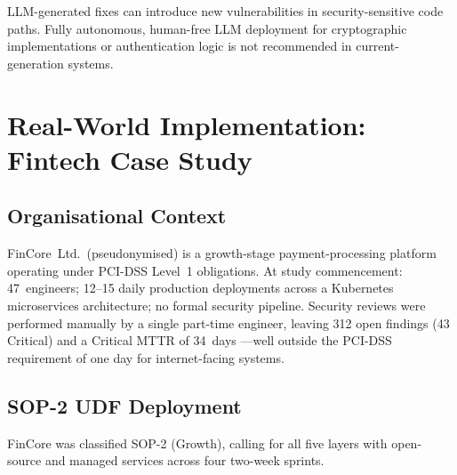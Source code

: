 \documentclass[letterpaper, 10pt, conference]{ieeeconf}
\begin{document}
LLM-generated fixes can introduce new vulnerabilities in
security-sensitive code paths. Fully autonomous, human-free LLM
deployment for cryptographic implementations or authentication logic is
not recommended in current-generation systems.

\section{Real-World Implementation: Fintech Case Study}

\subsection{Organisational Context}

FinCore~Ltd.\ (pseudonymised) is a growth-stage payment-processing
platform operating under PCI-DSS Level~1 obligations. At study
commencement: 47~engineers; 12--15 daily production deployments across
a Kubernetes microservices architecture; no formal security pipeline.
Security reviews were performed manually by a single part-time engineer,
leaving 312 open findings (43 Critical) and a Critical MTTR of 34~days
---well outside the PCI-DSS requirement of one day for internet-facing
systems.

\subsection{SOP-2 UDF Deployment}

FinCore was classified SOP-2 (Growth), calling for all five layers with
open-source and managed services across four two-week sprints.
\end{document}
